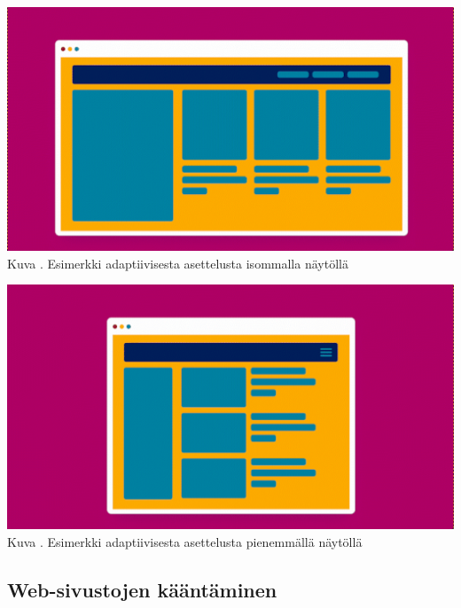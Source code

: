 \documentclass[11pt,a4paper,titlepage,oneside]{article}
\begin{document}
\bigskip
\includegraphics[width = 15cm]{src/public/oppar/adaptiveBig.png}\\
Kuva \getImgCount {}. Esimerkki adaptiivisesta asettelusta isommalla näytöllä 
 
\bigskip

\includegraphics[width = 15cm]{src/public/oppar/adaptivesmall.png}\\
Kuva \getImgCount {}. Esimerkki adaptiivisesta asettelusta pienemmällä näytöllä




















\newpage
\subsection{Web-sivustojen kääntäminen}
\end{document}
